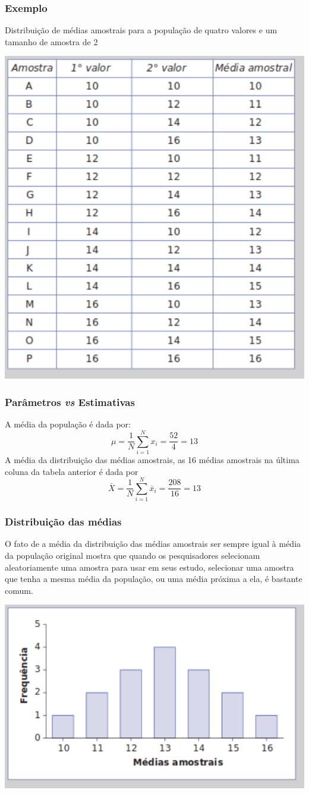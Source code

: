 \documentclass[11pt]{beamer}
\begin{document}
\begin{frame}
\frametitle{Exemplo}
Distribuição de médias amostrais para a população de quatro valores e um tamanho de amostra de 2
\begin{center}\includegraphics[width=0.5\linewidth]{figs/chap5tab5.2} \end{center}
\end{frame}

\begin{frame}
\frametitle{Parâmetros \textit{vs} Estimativas}
A média da população é dada por:
\[\mu=\frac{1}{N}\sum_{i=1}^Nx_i=\frac{52}{4}=13\]
A média da distribuição das médias amostrais, as 16 médias amostrais na última coluna da tabela anterior é dada por
\[\bar{X}=\frac{1}{N}\sum_{i=1}^N\bar{x}_i=\frac{208}{16}=13\]

\end{frame}

\begin{frame}
\frametitle{Distribuição das médias}
O fato de a média da distribuição das médias amostrais ser sempre igual à média da população original mostra que quando os pesquisadores selecionam aleatoriamente uma amostra para usar em seus estudo, selecionar uma amostra que tenha a mesma média da população, ou uma média próxima a ela, é bastante comum.
\begin{center}\includegraphics[width=0.6\linewidth]{figs/chap5fig5.1} \end{center}

\end{frame}
\end{document}
